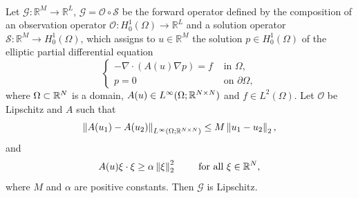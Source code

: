 \documentclass[10pt]{article}
\begin{document}
\begin{lemma}
\label{G_lipschitz}
\leavevmode \\
Let $\mathcal{G} \colon \mathbb{R}^M \to \mathbb{R}^L$, $\mathcal{G} = \mathcal{O} \circ \mathcal{S}$ be the forward operator defined by the composition of an observation operator $\mathcal{O} \colon H^1_0(\Omega) \to \mathbb{R}^L$ and a solution operator $\mathcal{S} \colon \mathbb{R}^M \to H^1_0(\Omega)$, which assigns to $u \in \mathbb{R}^M$ the solution $p \in H^1_0(\Omega)$ of the elliptic partial differential equation
\begin{equation}
\label{problem_lemma}
\begin{cases}
- \nabla \cdot ( {A(u) \nabla p} ) = f & \text{ in } \Omega, \\
p = 0 & \text{ on } \partial \Omega,
\end{cases}
\end{equation}
where $\Omega \subset \mathbb{R}^N$ is a domain, $A(u) \in L^{\infty}(\Omega; \mathbb{R}^{N \times N})$ and $f \in L^2(\Omega)$.
Let $\mathcal{O}$ be Lipschitz and $A$ such that
\[ \left\|A(u_1) - A(u_2)\right\|_{L^{\infty}(\Omega; \mathbb{R}^{N \times N})} \le M \left\|u_1 - u_2\right\|_2, \]
and
\[ A(u) \xi \cdot \xi \ge \alpha \left\|\xi\right\|_2^2 \qquad \text{ for all } \xi \in \mathbb{R}^N, \]
where $M$ and $\alpha$ are positive constants. Then $\mathcal{G}$ is Lipschitz.
\end{lemma}
\end{document}
